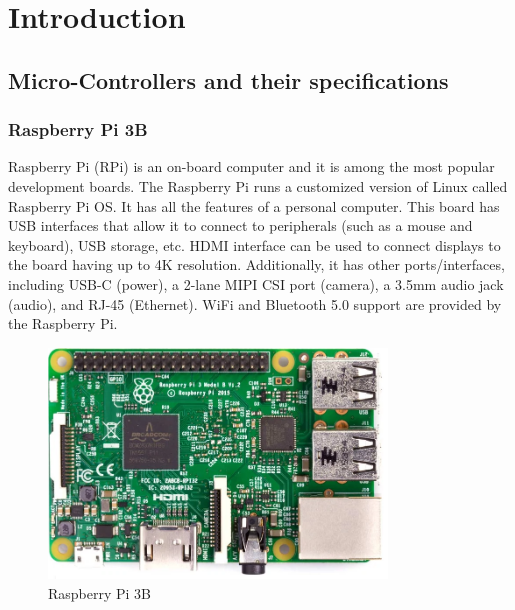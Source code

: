 \chapter{Introduction}
\section{Micro-Controllers and their specifications}
\subsection{Raspberry Pi 3B}
\par  Raspberry Pi (RPi) is an on-board computer and it is among the most popular development boards. The Raspberry Pi runs a customized version of Linux called Raspberry Pi OS. It has all the features of a personal computer. This board has USB interfaces that allow it to connect to peripherals (such as a mouse and keyboard), USB storage, etc. HDMI interface can be used to connect displays to the board having up to 4K resolution. Additionally, it has other ports/interfaces, including USB-C (power), a 2-lane MIPI CSI port (camera), a 3.5mm audio jack (audio), and RJ-45 (Ethernet). WiFi and Bluetooth 5.0 support are provided by the Raspberry Pi.

\begin{figure}[h!]
\centering
\includegraphics[width=9cm]{./Figures/Rpi_3B.png}
\caption{Raspberry Pi 3B}
\label{Rpi_3B}
\end{figure}


